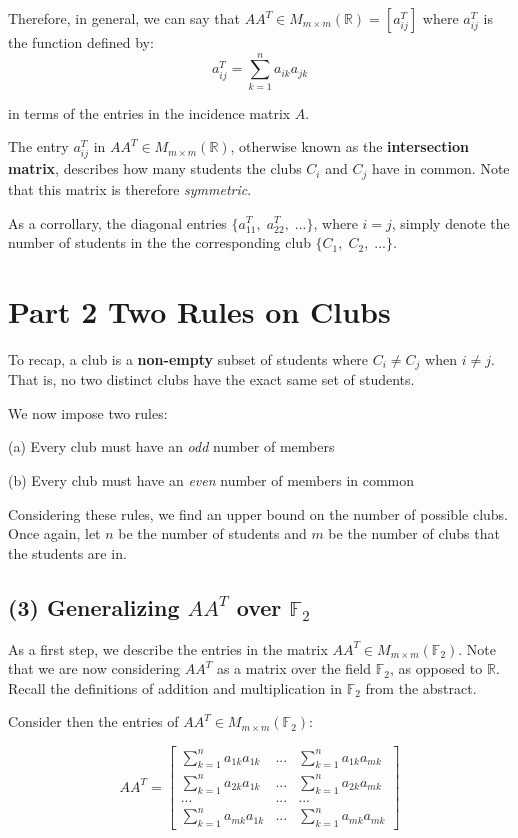 \documentclass[12pt, letterpaper]{article}
\newcommand{\F}{\mathbb{F}}
\newcommand{\R}{\mathbb{R}}
\newcommand{\0}{\textbf{0}}
\newcommand{\1}{\textbf{1}}
\let\tab\quad
\begin{document}
Therefore, in general, we can say that $AA^T \in M_{m \times m}(\R) = [ a^T_{ij} ]$ where $a^T_{ij}$ is the function defined by:
$$
a^T_{ij} = \sum_{k=1}^{n} a_{ik}a_{jk}
$$

in terms of the entries in the incidence matrix $A$.

The entry $a^T_{ij}$ in $AA^T \in M_{m \times m}(\R)$, otherwise known as the \textbf{intersection matrix}, describes how many students the clubs $C_i$ and $C_j$ have in common. Note that this matrix is therefore \emph{symmetric}.

As a corrollary, the diagonal entries $\{ a^T_{11},\; a^T_{22},\; ... \}$, where $i = j$, simply denote the number of students in the the corresponding club $\{ C_{1},\; C_{2},\; ... \}$. \\

\section*{Part 2 \textmd{Two Rules on Clubs}}

To recap, a club is a \textbf{non-empty} subset of students where $C_i \ne C_j$ when $i \ne j$. That is, no two distinct clubs have the exact same set of students. 

We now impose two rules:

\tab (a) Every club must have an \emph{odd} number of members

\tab (b) Every club must have an \emph{even} number of members in common

Considering these rules, we find an upper bound on the number of possible clubs. Once again, let $n$ be the number of students and $m$ be the number of clubs that the students are in.

\subsection*{(3) \textmd{Generalizing $AA^T$ over $\F_2$}}

As a first step, we describe the entries in the matrix $AA^T \in M_{m \times m}(\F_2)$. Note that we are now considering $AA^T$ as a matrix over the field $\F_2$, as opposed to $\R$. Recall the definitions of addition and multiplication in $\F_2$ from the abstract.

Consider then the entries of $AA^T \in M_{m \times m}(\F_2)$:

$$
AA^T=
\begin{bmatrix}
\sum_{k=1}^{n} a_{1k}a_{1k} & ... & \sum_{k=1}^{n} a_{1k}a_{mk}  \\
\sum_{k=1}^{n} a_{2k}a_{1k}  & ... & \sum_{k=1}^{n} a_{2k}a_{mk}  \\
... & ... & ... \\
\sum_{k=1}^{n} a_{mk}a_{1k} &  ... & \sum_{k=1}^{n} a_{mk}a_{mk} 
\end{bmatrix}
$$
\end{document}
